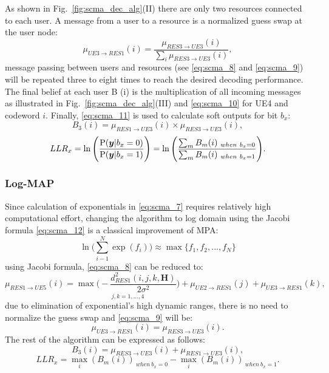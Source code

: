 As shown in Fig.~\ref{fig:scma_dec_alg}(II) there are only two resources
connected to each user. A message from a user to a resource is a normalized
guess swap at the user node:
\begin{equation}
  \label{eq:scma_9}
  \mu_{UE3 \rightarrow RES1}(i) = \frac{\mu_{RES3 \rightarrow UE3}(i)}
  {\sum_i\mu_{RES3 \rightarrow UE3}(i)},
\end{equation}
message passing between users and resources (see \eqref{eq:scma_8} and
\eqref{eq:scma_9}) will be repeated three to eight times to reach the desired
decoding performance. The final belief at each user B (i) is the multiplication
of all incoming messages as illustrated in Fig.~{\ref{fig:scma_dec_alg}}(III)
and \eqref{eq:scma_10} for UE4 and codeword $i$. Finally, \eqref{eq:scma_11} is
used to calculate soft outputs for bit $b_x$:
\begin{equation}
  \label{eq:scma_10}
  B_3(i) = \mu_{RES1 \rightarrow UE3}(i) \times \mu_{RES3 \rightarrow UE3}(i),
\end{equation}
\begin{equation}
  \label{eq:scma_11}
  LLR_x = \ln \Bigg( \frac{\operatorname{P}(\bm{y}|b_x=0)}{\operatorname{P}(\bm{y}|b_x=1)} \Bigg) =
  \ln \Bigg( \frac{\sum_m B_m(i)_{~when~b_x=0}}{\sum_m B_m(i)_{~when~b_x=1}}
  \Bigg).
\end{equation}

\subsubsection{Log-MAP}
\label{sec:scma_log-map}

Since calculation of exponentials in \eqref{eq:scma_7} requires relatively high
computational effort, changing the algorithm to log domain using the Jacobi
formula \eqref{eq:scma_12} is a classical improvement of MPA:
\begin{equation}
  \label{eq:scma_12}
  \ln \Bigg( \sum\limits_{i-1}^N\exp(f_i) \Bigg) \approx \max\{f_1,f_2,...,f_N\}
\end{equation}
using Jacobi formula, \eqref{eq:scma_8} can be reduced to:
\begin{equation}
  \label{eq:scma_13}
  \mu_{RES1 \rightarrow UE5}(i) = \underset{j,k=1,...,4}
  {\max \Bigg(-\frac{d_{RES1}^2(i,j,k,\bm{H})}{2\sigma^2} \Bigg)} +
  \mu_{UE2 \rightarrow RES1}(j) + \mu_{UE3 \rightarrow RES1}(k),
\end{equation}
due to elimination of exponential's high dynamic ranges, there is no need to
normalize the guess swap and \eqref{eq:scma_9} will be:
\begin{equation}
  \label{eq:scma_14}
  \mu_{UE3 \rightarrow RES1}(i) = \mu_{RES3 \rightarrow UE3}(i).
\end{equation}
The rest of the algorithm can be expressed as follows:
\begin{equation}
  \label{eq:scma_15}
  B_3(i) = \mu_{RES3 \rightarrow UE3}(i) + \mu_{RES1 \rightarrow UE3}(i),
\end{equation}
\begin{equation}
  \label{eq:scma_16}
  LLR_x = \max_i(B_m(i))_{~when~b_x=0} - \max_i(B_m(i))_{~when~b_x=1}.
\end{equation}

